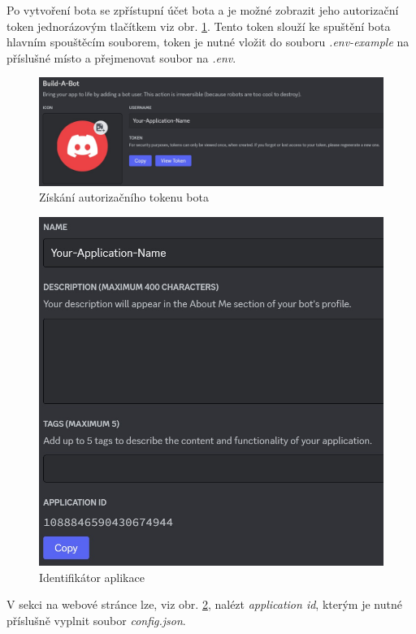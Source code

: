 \documentclass[
  program=inf,
biblatex=false,
sourcecodes=true,
joinlists=true,
  figures=true,
  tables=true,
  glossaries=true,
  index=false
]{kidiplom}
\begin{document}
Po vytvoření bota se zpřístupní účet bota a je možné zobrazit jeho autorizační token
jednorázovým tlačítkem  viz obr. \ref{token}. Tento token 
slouží ke spuštění bota hlavním spouštěcím souborem, token je nutné vložit do souboru
{\it .env-example}
na příslušné místo a přejmenovat soubor na {\it .env}.

\begin{figure}[h]
  \centering \includegraphics[scale=0.5]{token}
  \caption{\label{token}Získání autorizačního tokenu bota}
\end{figure}

\begin{figure}[h]
  \centering \includegraphics[scale=0.6]{appid}
  \caption{\label{appid}Identifikátor aplikace}
\end{figure}

V sekci  na webové stránce lze, viz obr. \ref{appid},
nalézt {\it application id}, kterým je nutné příslušně vyplnit soubor {\it config.json}.
\end{document}
